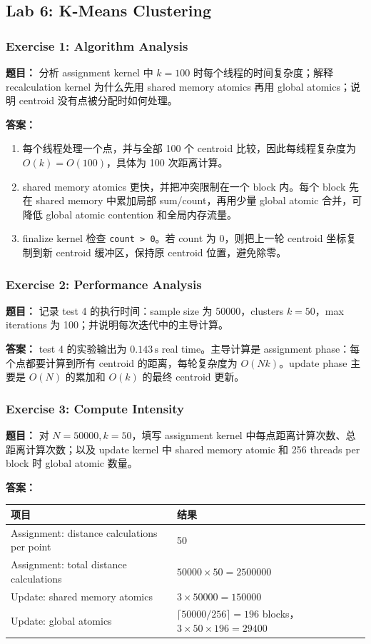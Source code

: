 \documentclass[10pt,a4paper]{article}
\begin{document}
\subsection{Lab 6: K-Means Clustering}

\subsubsection{Exercise 1: Algorithm Analysis}
\noindent\textbf{题目：} 分析 assignment kernel 中 $k=100$ 时每个线程的时间复杂度；解释 recalculation kernel 为什么先用 shared memory atomics 再用 global atomics；说明 centroid 没有点被分配时如何处理。

\noindent\textbf{答案：}
\begin{enumerate}[label=\arabic*.]
\item 每个线程处理一个点，并与全部 100 个 centroid 比较，因此每线程复杂度为 $O(k)=O(100)$，具体为 100 次距离计算。
\item shared memory atomics 更快，并把冲突限制在一个 block 内。每个 block 先在 shared memory 中累加局部 sum/count，再用少量 global atomic 合并，可降低 global atomic contention 和全局内存流量。
\item finalize kernel 检查 \texttt{count > 0}。若 count 为 0，则把上一轮 centroid 坐标复制到新 centroid 缓冲区，保持原 centroid 位置，避免除零。
\end{enumerate}

\subsubsection{Exercise 2: Performance Analysis}
\noindent\textbf{题目：} 记录 test 4 的执行时间：sample size 为 50000，clusters $k=50$，max iterations 为 100；并说明每次迭代中的主导计算。

\noindent\textbf{答案：} test 4 的实验输出为 $0.143\,\mathrm{s}$ real time。主导计算是 assignment phase：每个点都要计算到所有 centroid 的距离，每轮复杂度为 $O(Nk)$。update phase 主要是 $O(N)$ 的累加和 $O(k)$ 的最终 centroid 更新。

\subsubsection{Exercise 3: Compute Intensity}
\noindent\textbf{题目：} 对 $N=50000,k=50$，填写 assignment kernel 中每点距离计算次数、总距离计算次数；以及 update kernel 中 shared memory atomic 和 256 threads per block 时 global atomic 数量。

\noindent\textbf{答案：}
\begin{center}
\small
\begin{tabular}{ll}
\toprule
项目 & 结果 \\
\midrule
Assignment: distance calculations per point & 50 \\
Assignment: total distance calculations & $50000\times50=2500000$ \\
Update: shared memory atomics & $3\times50000=150000$ \\
Update: global atomics & $\lceil50000/256\rceil=196$ blocks，$3\times50\times196=29400$ \\
\bottomrule
\end{tabular}
\end{center}
\end{document}
